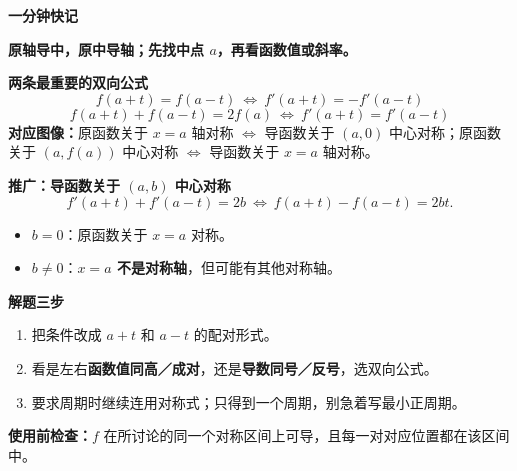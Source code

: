 \clearpage
\begin{summarybox}
  \textbf{\textcolor{CSummary}{一分钟快记}}\par\nopagebreak[4]

  \textbf{原轴导中，原中导轴；先找中点 $a$，再看函数值或斜率。}

\begin{center}

\end{center}

  \medskip
  \textbf{\textcolor{CSummary}{两条最重要的双向公式}}
  \[
    \boxed{f(a+t)=f(a-t)\ \Longleftrightarrow\ f'(a+t)=-f'(a-t)}
  \]
  \[
    \boxed{f(a+t)+f(a-t)=2f(a)\ \Longleftrightarrow\ f'(a+t)=f'(a-t)}
  \]
  \textbf{对应图像：}原函数关于 $x=a$ 轴对称 $\Longleftrightarrow$ 导函数关于 $(a,0)$ 中心对称；原函数关于 $(a,f(a))$ 中心对称 $\Longleftrightarrow$ 导函数关于 $x=a$ 轴对称。

  \medskip
  \textbf{\textcolor{CSummary}{推广：导函数关于 $(a,b)$ 中心对称}}
  \[
    \boxed{f'(a+t)+f'(a-t)=2b\ \Longleftrightarrow\ f(a+t)-f(a-t)=2bt.}
  \]
  \begin{itemize}[leftmargin=*,itemsep=0.25em,topsep=0.25em]
    \item $b=0$：原函数关于 $x=a$ 对称。
    \item $b\ne0$：\textbf{$x=a$ 不是对称轴}，但可能有其他对称轴。
  \end{itemize}

  \medskip
  \textbf{\textcolor{CSummary}{解题三步}}
  \begin{enumerate}[leftmargin=*,itemsep=0.25em,topsep=0.25em]
    \item 把条件改成 $a+t$ 和 $a-t$ 的配对形式。
    \item 看是左右\textbf{函数值同高／成对}，还是\textbf{导数同号／反号}，选双向公式。
    \item 要求周期时继续连用对称式；只得到一个周期，别急着写最小正周期。
  \end{enumerate}
  \textbf{\textcolor{CSummary}{使用前检查：}}$f$ 在所讨论的同一个对称区间上可导，且每一对对应位置都在该区间中。
\end{summarybox}
